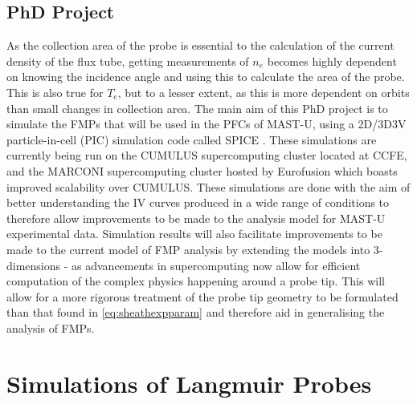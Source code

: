 \documentclass[a4paper, 12pt]{article} %
\begin{document}
\subsection{\label{subsec:motivation}PhD Project}
	As the collection area of the probe is essential to the calculation of the current density of the flux tube, getting measurements of $n_e$ becomes highly dependent on knowing the incidence angle and using this to calculate the area of the probe.
	This is also true for $T_e$, but to a lesser extent, as this is more dependent on orbits than small changes in collection area. 
	The main aim of this PhD project is to simulate the FMPs that will be used in the PFCs of MAST-U, using a 2D/3D3V particle-in-cell (PIC) simulation code called SPICE \cite{Komm2011, Komm2013}. 
	These simulations are currently being run on the CUMULUS supercomputing cluster located at CCFE, and the MARCONI supercomputing cluster hosted by Eurofusion\cite{Voitsekhovitch2018} which boasts  improved scalability over CUMULUS.
	These simulations are done with the aim of better understanding the IV curves produced in a wide range of conditions to therefore allow improvements to be made to the analysis model for MAST-U experimental data.
	Simulation results will also facilitate improvements to be made to the current model of FMP analysis by extending the models into 3-dimensions - as advancements in supercomputing now allow for efficient computation of the complex physics happening around a probe tip.
	This will allow for a more rigorous treatment of the probe tip geometry to be formulated than that found in \cref{eq:sheathexpparam} and therefore aid in generalising the analysis of FMPs.


\section{\label{sec:lpsims}Simulations of Langmuir Probes}
\end{document}
